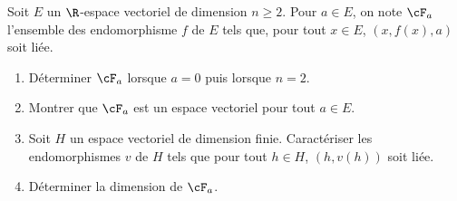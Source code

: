 \begin{enonce}
\begin{exercise}[ID={RMS126 E651},subtitle={Centrale MP 2015},tags={mpsi},difficulty={2}]
Soit $E$ un $\R$-espace vectoriel de dimension $n\geq2$.
Pour $a\in E$, on note $\cF_a$ l'ensemble des endomorphisme $f$ de $E$ tels que, pour tout $x\in E$, $\left( x, f(x), a \right)$ soit liée.
\begin{enumerate}
  \item Déterminer $\cF_a$ lorsque $a=0$ puis lorsque $n=2$.
  \item Montrer que $\cF_a$ est un espace vectoriel pour tout $a\in E$.
  \item Soit $H$ un espace vectoriel de dimension finie.
    Caractériser les endomorphismes $v$ de $H$ tels que pour tout $h\in H$, $\left( h, v(h) \right)$ soit liée.
  \item Déterminer la dimension de $\cF_a$.
\end{enumerate}
\end{exercise}
\begin{solution}
\end{solution}
\end{enonce}
